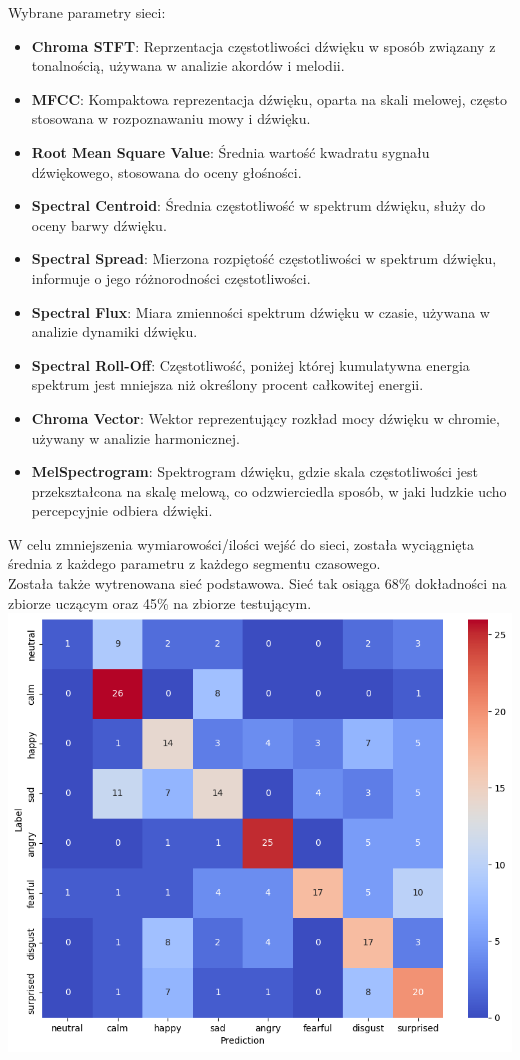 \documentclass[12pt,titlepage]{article}
\begin{document}
Wybrane parametry sieci:
\begin{itemize}
    \item \textbf{Chroma STFT}: Reprzentacja częstotliwości dźwięku w sposób związany z tonalnością, używana w analizie akordów i melodii.
    \item \textbf{MFCC}: Kompaktowa reprezentacja dźwięku, oparta na skali melowej, często stosowana w rozpoznawaniu mowy i dźwięku.
    \item \textbf{Root Mean Square Value}: Średnia wartość kwadratu sygnału dźwiękowego, stosowana do oceny głośności.
    \item \textbf{Spectral Centroid}: Średnia częstotliwość w spektrum dźwięku, służy do oceny barwy dźwięku.
    \item \textbf{Spectral Spread}: Mierzona rozpiętość częstotliwości w spektrum dźwięku, informuje o jego różnorodności częstotliwości.
    \item \textbf{Spectral Flux}: Miara zmienności spektrum dźwięku w czasie, używana w analizie dynamiki dźwięku.
    \item \textbf{Spectral Roll-Off}: Częstotliwość, poniżej której kumulatywna energia spektrum jest mniejsza niż określony procent całkowitej energii.
    \item \textbf{Chroma Vector}: Wektor reprezentujący rozkład mocy dźwięku w chromie, używany w analizie harmonicznej.
    \item \textbf{MelSpectrogram}: Spektrogram dźwięku, gdzie skala częstotliwości jest przekształcona na skalę melową, co odzwierciedla sposób, w jaki ludzkie ucho percepcyjnie odbiera dźwięki.
\end{itemize}

W celu zmniejszenia wymiarowości/ilości wejść do sieci, została wyciągnięta średnia z każdego parametru z każdego segmentu czasowego.\\

Została także wytrenowana sieć podstawowa. Sieć tak osiąga 68\% dokładności na zbiorze uczącym oraz 45\% na zbiorze testującym.\\
\includegraphics[width=\linewidth]{img/error_matrix.png}
\end{document}
